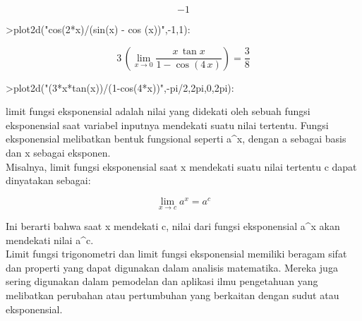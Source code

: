 \documentclass[a4paper,10pt]{article}
\begin{document}
\begin{eulernotebook}
\begin{eulercomment}
\begin{eulercomment}
\begin{eulercomment}
\begin{eulercomment}
\begin{eulercomment}
\begin{eulercomment}
\begin{eulercomment}
\begin{eulercomment}
\begin{eulercomment}
\begin{eulerformula}
\[ -1
\]
\end{eulerformula}
\begin{eulerprompt}
>plot2d("cos(2*x)/(sin(x) - cos (x))",-1,1):
\end{eulerprompt}
\begin{eulerformula}
\[
3\,\left(\lim_{x\rightarrow 0}{\frac{x\,\tan x}{1-\cos \left(4\,x
 \right)}}\right)=\frac{3}{8}
\]
\end{eulerformula}
\begin{eulerprompt}
>plot2d("(3*x*tan(x))/(1-cos(4*x))",-pi/2,2pi,0,2pi):
\end{eulerprompt}
\begin{eulercomment}
limit fungsi eksponensial adalah nilai yang didekati oleh sebuah
fungsi eksponensial saat variabel inputnya mendekati suatu nilai
tertentu. Fungsi eksponensial melibatkan bentuk fungsional seperti
a\textasciicircum{}x, dengan a sebagai basis dan x sebagai eksponen.\\
Misalnya, limit fungsi eksponensial saat x mendekati suatu nilai
tertentu c dapat dinyatakan sebagai:

\end{eulercomment}
\begin{eulerformula}
\[
\lim_{x \to c} a^x = a^c
\]
\end{eulerformula}
\begin{eulercomment}
Ini berarti bahwa saat x mendekati c, nilai dari fungsi eksponensial
a\textasciicircum{}x akan mendekati nilai a\textasciicircum{}c.\\
Limit fungsi trigonometri dan limit fungsi eksponensial memiliki
beragam sifat dan properti yang dapat digunakan dalam analisis
matematika. Mereka juga sering digunakan dalam pemodelan dan aplikasi
ilmu pengetahuan yang melibatkan perubahan atau pertumbuhan yang
berkaitan dengan sudut atau eksponensial.


\end{eulercomment}
\end{eulercomment}
\end{eulercomment}
\end{eulercomment}
\end{eulercomment}
\end{eulercomment}
\end{eulercomment}
\end{eulercomment}
\end{eulercomment}
\end{eulercomment}
\end{eulernotebook}
\end{document}
